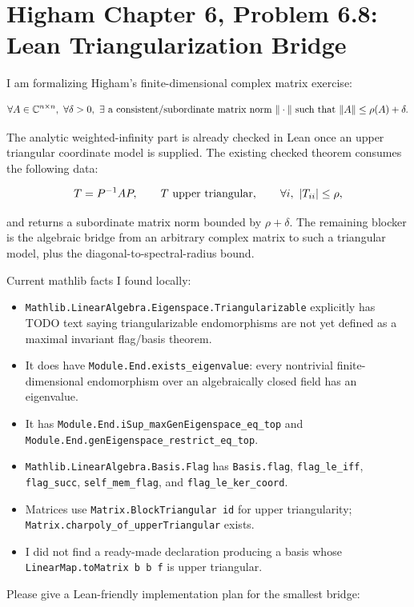 \section*{Higham Chapter 6, Problem 6.8: Lean Triangularization Bridge}

I am formalizing Higham's finite-dimensional complex matrix exercise:

\[
\forall A\in\mathbb C^{n\times n},\ \forall \delta>0,\ \exists\hbox{ a
consistent/subordinate matrix norm } \|\cdot\| \hbox{ such that }
\|A\| \le \rho(A)+\delta .
\]

The analytic weighted-infinity part is already checked in Lean once an upper
triangular coordinate model is supplied.  The existing checked theorem consumes
the following data:

\[
T = P^{-1} A P,\qquad T\hbox{ upper triangular},\qquad
\forall i,\ |T_{ii}|\le \rho ,
\]

and returns a subordinate matrix norm bounded by \(\rho+\delta\).  The remaining
blocker is the algebraic bridge from an arbitrary complex matrix to such a
triangular model, plus the diagonal-to-spectral-radius bound.

Current mathlib facts I found locally:

\begin{itemize}
\item \texttt{Mathlib.LinearAlgebra.Eigenspace.Triangularizable} explicitly
has TODO text saying triangularizable endomorphisms are not yet defined as a
maximal invariant flag/basis theorem.
\item It does have \texttt{Module.End.exists\_eigenvalue}: every nontrivial
finite-dimensional endomorphism over an algebraically closed field has an
eigenvalue.
\item It has \texttt{Module.End.iSup\_maxGenEigenspace\_eq\_top} and
\texttt{Module.End.genEigenspace\_restrict\_eq\_top}.
\item \texttt{Mathlib.LinearAlgebra.Basis.Flag} has \texttt{Basis.flag},
\texttt{flag\_le\_iff}, \texttt{flag\_succ}, \texttt{self\_mem\_flag},
and \texttt{flag\_le\_ker\_coord}.
\item Matrices use \texttt{Matrix.BlockTriangular id} for upper triangularity;
\texttt{Matrix.charpoly\_of\_upperTriangular} exists.
\item I did not find a ready-made declaration producing a basis whose
\texttt{LinearMap.toMatrix b b f} is upper triangular.
\end{itemize}

Please give a Lean-friendly implementation plan for the smallest bridge:

